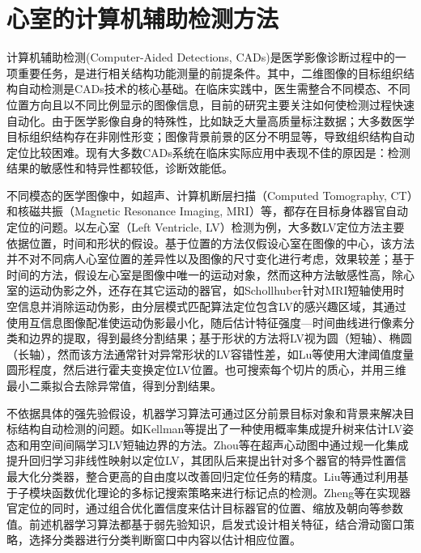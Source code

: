 \chapter{心室的计算机辅助检测方法}
\label{chap:Detection}


计算机辅助检测(Computer-Aided Detections, CADs)是医学影像诊断过程中的一项重要任务，是进行相关结构功能测量的前提条件。其中，二维图像的目标组织结构自动检测是CADs技术的核心基础。在临床实践中，医生需整合不同模态、不同位置方向且以不同比例显示的图像信息，目前的研究主要关注如何使检测过程快速自动化。由于医学影像自身的特殊性，比如缺乏大量高质量标注数据；大多数医学目标组织结构存在非刚性形变；图像背景前景的区分不明显等，导致组织结构自动定位比较困难。现有大多数CADs系统在临床实际应用中表现不佳的原因是：检测结果的敏感性和特异性都较低，诊断效能低\citep{Cheng2016a}。


不同模态的医学图像中，如超声、计算机断层扫描（Computed Tomography, CT）和核磁共振（Magnetic Resonance Imaging, MRI）等，都存在目标身体器官自动定位的问题。以左心室（Left Ventricle, LV）检测为例，大多数LV定位方法主要依据位置，时间和形状的假设。基于位置的方法仅假设心室在图像的中心，该方法并不对不同病人心室位置的差异性以及图像的尺寸变化进行考虑，效果较差；基于时间的方法，假设左心室是图像中唯一的运动对象，然而这种方法敏感性高，除心室的运动伪影之外，还存在其它运动的器官，如Schollhuber\citep{Schollhuber2008}针对MRI短轴使用时空信息并消除运动伪影，由分层模式匹配算法定位包含LV的感兴趣区域，其通过使用互信息图像配准使运动伪影最小化，随后估计特征强度—时间曲线进行像素分类和边界的提取，得到最终分割结果；基于形状的方法将LV视为圆（短轴）、椭圆（长轴），然而该方法通常针对异常形状的LV容错性差，如Lu等\citep{Lu2009}使用大津阈值度量圆形程度，然后进行霍夫变换定位LV位置。也可搜索每个切片的质心，并用三维最小二乘拟合去除异常值，得到分割结果\citep{Petitjean2011}。


不依据具体的强先验假设，机器学习算法可通过区分前景目标对象和背景来解决目标结构自动检测的问题。如Kellman等\citep{Lu2011}提出了一种使用概率集成提升树来估计LV姿态和用空间间隔学习LV短轴边界的方法。Zhou等\citep{Zhou2005}在超声心动图中通过规一化集成提升回归学习非线性映射以定位LV，其团队后来提出针对多个器官的特异性置信最大化分类器，整合更高的自由度以改善回归定位任务的精度。Liu等\citep{She2007}通过利用基于子模块函数优化理论的多标记搜索策略来进行标记点的检测。Zheng等\citep{Zheng2014}在实现器官定位的同时，通过组合优化置信度来估计目标器官的位置、缩放及朝向等参数值。前述机器学习算法都基于弱先验知识，启发式设计相关特征，结合滑动窗口策略，选择分类器进行分类判断窗口中内容以估计相应位置。


